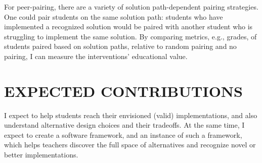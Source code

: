 \documentclass[12pt]{article}
\begin{document}
For peer-pairing, there are a variety of solution path-dependent pairing strategies. One could pair students on the same solution path: students who have implemented a recognized solution would be paired with another student who is struggling to implement the same solution. By comparing metrics, e.g., grades, of students paired based on solution paths, relative to random pairing and no pairing, I can measure the interventions' educational value.


%

\section{EXPECTED CONTRIBUTIONS}

I expect to help students reach their envisioned (valid) implementations, and also understand alternative design choices and their tradeoffs. At the same time, I expect to create a software framework, and an instance of such a framework, which helps teachers discover the full space of alternatives and recognize novel or better implementations.
\end{document}
